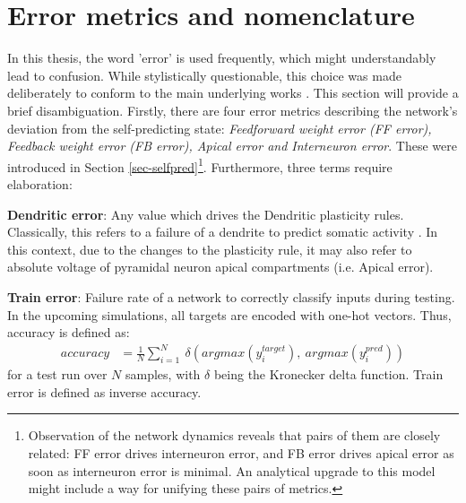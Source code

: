 \section{Error metrics and nomenclature}

In this thesis, the word 'error' is used frequently, which might understandably lead to confusion. While stylistically
questionable, this choice was made deliberately to conform to the main underlying works
\citep{urbanczik2014learning,sacramento2018dendritic,whittington2019theories,Haider2021}. This section will provide a
brief disambiguation. Firstly, there are four error metrics describing the network's deviation from the self-predicting
state: \textit{Feedforward weight error (FF error), Feedback weight error (FB error), Apical error and Interneuron
  error}. These were introduced in Section \ref{sec-selfpred}\footnote{Observation of the network dynamics reveals that
  pairs of them are closely related: FF error drives interneuron error, and FB error drives apical error as soon as
  interneuron error is minimal. An analytical upgrade to this model might include a way for unifying these pairs of
  metrics.}. Furthermore, three terms require elaboration:\newline

\textbf{Dendritic error}: Any value which drives the Dendritic plasticity rules. Classically, this refers to a failure
of a dendrite to predict somatic activity \citep{urbanczik2014learning}. In this context, due to the changes to the
plasticity rule, it may also refer to absolute voltage of pyramidal neuron apical compartments (i.e. Apical error).
\newline

\textbf{Train error}: Failure rate of a network to correctly classify inputs during testing. In the upcoming
simulations, all targets are encoded with one-hot vectors. Thus, accuracy is defined as:
\begin{align*}
  accuracy & = \frac{1}{N} \sum_{i=1}^N \  \delta \left(argmax(y^{target}_i),\ argmax(y^{pred}_i) \right)
\end{align*}
for a test run over $N$ samples, with $\delta$ being the Kronecker delta function. Train error is defined as inverse
accuracy.\newline

